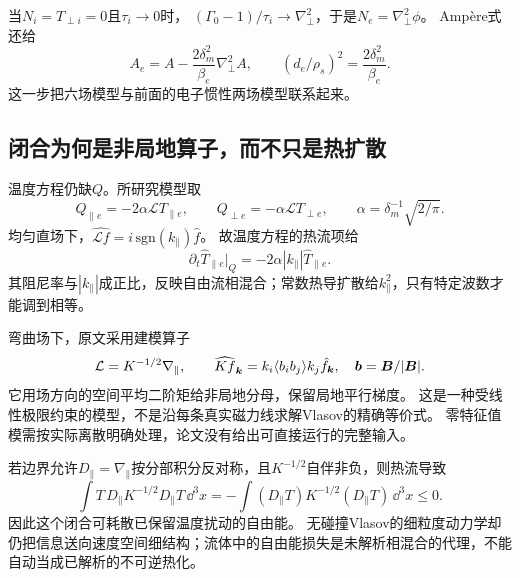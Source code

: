 当$N_i=T_{\perp i}=0$且$\tau_i\to0$时，
$(\Gamma_0-1)/\tau_i\to\nabla_\perp^2$，于是$N_e=\nabla_\perp^2\phi$。
Ampère式还给
\begin{equation}
 A_e=A-\frac{2\delta_m^2}{\beta_e}\nabla_\perp^2A,
 \qquad (d_e/\rho_s)^2=\frac{2\delta_m^2}{\beta_e}.
\end{equation}
这一步把六场模型与前面的电子惯性两场模型联系起来。

\subsection{闭合为何是非局地算子，而不只是热扩散}
温度方程仍缺$Q$。所研究模型取
\begin{equation}
 Q_{\parallel e}=-2\alpha\mathcal L T_{\parallel e},\qquad
 Q_{\perp e}=-\alpha\mathcal L T_{\perp e},\qquad
 \alpha=\delta_m^{-1}\sqrt{2/\pi}.
\end{equation}
均匀直场下，$\widehat{\mathcal L f}=i\,\mathrm{sgn}(k_\parallel)\hat f$。
故温度方程的热流项给
\begin{equation}
 \partial_t\widehat T_{\parallel e}\big|_Q
 =-2\alpha|k_\parallel|\widehat T_{\parallel e}.
\end{equation}
其阻尼率与$|k_\parallel|$成正比，反映自由流相混合；常数热导扩散给$k_\parallel^2$，只有特定波数才能调到相等。

弯曲场下，原文采用建模算子
\begin{equation}
 \mathcal L=K^{-1/2}\nabla_\parallel,\qquad
 \widehat{Kf}_{\bm{k}}=k_i\langle b_ib_j\rangle k_j\hat f_{\bm{k}},
 \quad\bm{b}=\bm{B}/|\bm{B}|.
 \label{eq:landau_nonlocal}
\end{equation}
它用场方向的空间平均二阶矩给非局地分母，保留局地平行梯度。
这是一种受线性极限约束的模型，不是沿每条真实磁力线求解Vlasov的精确等价式。
零特征值模需按实际离散明确处理，论文没有给出可直接运行的完整输入。

若边界允许$D_\parallel=\nabla_\parallel$按分部积分反对称，且$K^{-1/2}$自伴非负，则热流导致
\begin{equation}
 \int T\,D_\parallel K^{-1/2}D_\parallel T\,\dd^3x
 =-\int (D_\parallel T)K^{-1/2}(D_\parallel T)\,\dd^3x\le0.
\end{equation}
因此这个闭合可耗散已保留温度扰动的自由能。
无碰撞Vlasov的细粒度动力学却仍把信息送向速度空间细结构；流体中的自由能损失是未解析相混合的代理，不能自动当成已解析的不可逆热化。

